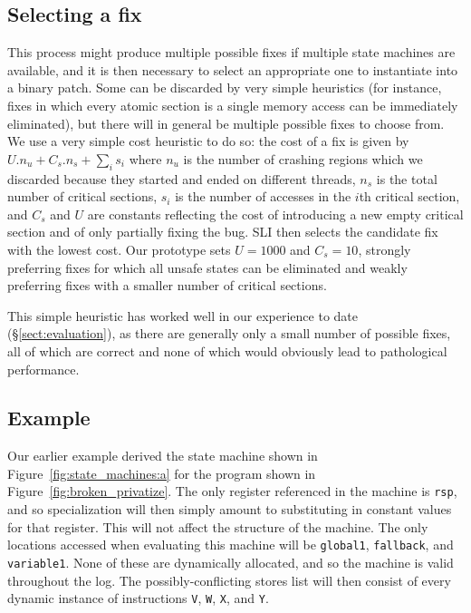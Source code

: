 \documentclass[10pt,letter,twocolumn]{sigplanconf}
\begin{document}
\subsection{Selecting a fix}
\label{sect:selectfix}

This process might produce multiple possible fixes if multiple state
machines are available, and it is then necessary to select an
appropriate one to instantiate into a binary patch.  Some can be
discarded by very simple heuristics (for instance, fixes in which
every atomic section is a single memory access can be immediately
eliminated), but there will in general be multiple possible fixes to
choose from.  We use a very simple cost heuristic to do so: the cost
of a fix is given by $U.n_u + C_s.n_s + {\sum_{i}}s_i$ where $n_u$ is
the number of crashing regions which we discarded because they started
and ended on different threads, $n_s$ is the total number of critical
sections, $s_i$ is the number of accesses in the $i$th critical
section, and $C_s$ and $U$ are constants reflecting the cost of
introducing a new empty critical section and of only partially fixing
the bug.  SLI then selects the candidate fix with the lowest cost.
Our prototype sets $U=1000$ and $C_s=10$, strongly preferring fixes
for which all unsafe states can be eliminated and weakly preferring
fixes with a smaller number of critical sections.

This simple heuristic has worked well in our experience to date
(\S\ref{sect:evaluation}), as there are generally only a small number
of possible fixes, all of which are correct and none of which would
obviously lead to pathological performance.

\subsection{Example}
\label{sect:final_example}

Our earlier example derived the state machine shown in
Figure~\ref{fig:state_machines:a} for the program shown in
Figure~\ref{fig:broken_privatize}.  The only register referenced in
the machine is \verb|rsp|, and so specialization will then simply
amount to substituting in constant values for that register.  This
will not affect the structure of the machine.  The only locations
accessed when evaluating this machine will be \verb|global1|,
\verb|fallback|, and \verb|variable1|.  None of these are dynamically
allocated, and so the machine is valid throughout the log.  The
possibly-conflicting stores list will then consist of every dynamic
instance of instructions \verb|V|, \verb|W|, \verb|X|, and \verb|Y|.
\end{document}
